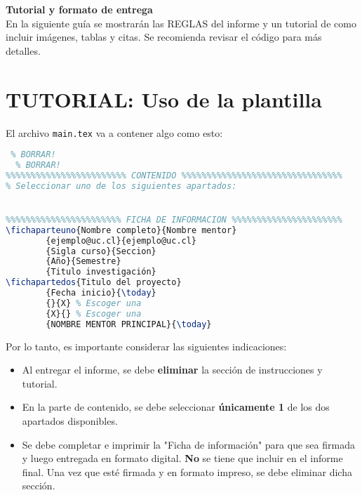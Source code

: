 \begin{center}
    \LARGE
    \textbf{Tutorial y formato de entrega}
    \label{sec:tutorial}
    \vspace{0.4cm}
    \normalsize\\
    En la siguiente guía se mostrarán las REGLAS del informe y un tutorial de como incluir imágenes, tablas y citas. Se recomienda revisar el código para más detalles.
\end{center}

\section{TUTORIAL: Uso de la plantilla}

El archivo \verb|main.tex| va a contener algo como esto:
\begin{lstlisting}[frame=single, language=TeX]
%%%%%%%%%%%%%%%%%%%%%%%% INSTRUCCIONES Y TUTORIAL %%%%%%%%%%%%%%%%%
 % BORRAR!
  % BORRAR!
%%%%%%%%%%%%%%%%%%%%%%%% CONTENIDO %%%%%%%%%%%%%%%%%%%%%%%%%%%%%%%%
% Seleccionar uno de los siguientes apartados:


%%%%%%%%%%%%%%%%%%%%%%% FICHA DE INFORMACION %%%%%%%%%%%%%%%%%%%%%%
\fichaparteuno{Nombre completo}{Nombre mentor}
        {ejemplo@uc.cl}{ejemplo@uc.cl}
        {Sigla curso}{Seccion}
        {Año}{Semestre}
        {Titulo investigación}
\fichapartedos{Titulo del proyecto}
        {Fecha inicio}{\today}
        {}{X} % Escoger una
        {X}{} % Escoger una
        {NOMBRE MENTOR PRINCIPAL}{\today}

\end{lstlisting}

Por lo tanto, es importante considerar las siguientes indicaciones:
\begin{itemize}
    \item Al entregar el informe, se debe \textbf{eliminar} la sección de instrucciones y tutorial.
    \item En la parte de contenido, se debe seleccionar \textbf{únicamente 1} de los dos apartados disponibles.
    \item Se debe completar e imprimir la "Ficha de información" para que sea firmada y luego entregada en formato digital. \textbf{No} se tiene que incluir en el informe final. Una vez que esté firmada y en formato impreso, se debe eliminar dicha sección.
\end{itemize}


